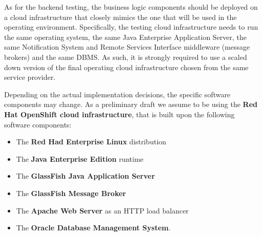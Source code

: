 As for the backend testing, the business logic components should be deployed on a cloud infrastructure that closely mimics the one that will be used in the operating environment. 
Specifically, the testing cloud infrastructure needs to run the same operating system, the same Java Enterprise Application Server, the same Notification System and Remote Services Interface middleware (message brokers) and the same DBMS.
As such, it is strongly required to use a scaled down version of the final operating cloud infrastructure chosen from the same service provider. 

Depending on the actual implementation decisions, the specific software components may change. As a preliminary draft we assume to be using the \textbf{Red Hat OpenShift cloud infrastructure}, that is built upon the following software components:
\begin{itemize}
	\item The \textbf{Red Had Enterprise Linux} distribution
	\item The \textbf{Java Enterprise Edition} runtime
	\item The \textbf{GlassFish Java Application Server}
	\item The \textbf{GlassFish Message Broker}
	\item The \textbf{Apache Web Server} as an HTTP load balancer
	\item The \textbf{Oracle Database Management System}.
\end{itemize}

